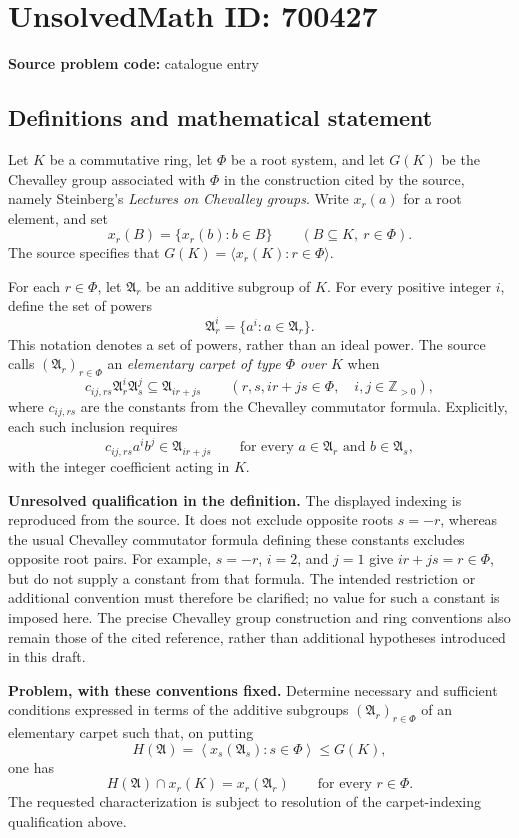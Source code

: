 \documentclass[11pt]{article}
\newcommand{\Z}{\mathbb{Z}}
\begin{document}
\section*{UnsolvedMath ID: 700427}
\textbf{Source problem code:} catalogue entry
\subsection{Definitions and mathematical statement}
Let \(K\) be a commutative ring, let \(\Phi\) be a root system, and let \(G(K)\) be the Chevalley group associated with \(\Phi\) in the construction cited by the source, namely Steinberg's \emph{Lectures on Chevalley groups}. Write \(x_r(a)\) for a root element, and set
\[
x_r(B)=\{x_r(b):b\in B\}\qquad(B\subseteq K,\ r\in\Phi).
\]
The source specifies that \(G(K)=\langle x_r(K):r\in\Phi\rangle\).

For each \(r\in\Phi\), let \(\mathfrak A_r\) be an additive subgroup of \(K\). For every positive integer \(i\), define the set of powers
\[
\mathfrak A_r^i=\{a^i:a\in\mathfrak A_r\}.
\]
This notation denotes a set of powers, rather than an ideal power. The source calls \((\mathfrak A_r)_{r\in\Phi}\) an \emph{elementary carpet of type \(\Phi\) over \(K\)} when
\[
c_{ij,rs}\mathfrak A_r^i\mathfrak A_s^j
\subseteq\mathfrak A_{ir+js}
\qquad
\left(r,s,ir+js\in\Phi,\quad i,j\in\Z_{>0}\right),
\]
where \(c_{ij,rs}\) are the constants from the Chevalley commutator formula. Explicitly, each such inclusion requires
\[
c_{ij,rs}a^i b^j\in\mathfrak A_{ir+js}
\qquad\text{for every }a\in\mathfrak A_r\text{ and }b\in\mathfrak A_s,
\]
with the integer coefficient acting in \(K\).

\textbf{Unresolved qualification in the definition.} The displayed indexing is reproduced from the source. It does not exclude opposite roots \(s=-r\), whereas the usual Chevalley commutator formula defining these constants excludes opposite root pairs. For example, \(s=-r\), \(i=2\), and \(j=1\) give \(ir+js=r\in\Phi\), but do not supply a constant from that formula. The intended restriction or additional convention must therefore be clarified; no value for such a constant is imposed here. The precise Chevalley group construction and ring conventions also remain those of the cited reference, rather than additional hypotheses introduced in this draft.

\textbf{Problem, with these conventions fixed.} Determine necessary and sufficient conditions expressed in terms of the additive subgroups \((\mathfrak A_r)_{r\in\Phi}\) of an elementary carpet such that, on putting
\[
H(\mathfrak A)=\left\langle x_s(\mathfrak A_s):s\in\Phi\right\rangle\leq G(K),
\]
one has
\[
H(\mathfrak A)\cap x_r(K)=x_r(\mathfrak A_r)
\qquad\text{for every }r\in\Phi.
\]
The requested characterization is subject to resolution of the carpet-indexing qualification above.
\end{document}
